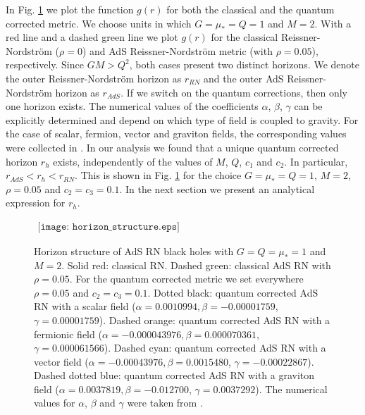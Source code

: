 \documentclass[10pt,a4paper]{article}
\begin{document}
In Fig. \ref{fig1} we plot the function $g(r)$ for both the classical and the quantum corrected metric. We choose units in which $G=\mu_{*}=Q=1$ and $M=2$. 
With a red line and a dashed green line we plot $g(r)$ for the classical Reissner-Nordstr\"om ($\rho=0$) and AdS Reissner-Nordstr\"om metric (with $\rho=0.05$), respectively. Since $GM>Q^2$, both cases present two distinct horizons. We denote the outer Reissner-Nordstr\"om horizon as $r_{RN}$ and the outer AdS Reissner-Nordstr\"om horizon as $r_{AdS}$. If we switch on the quantum corrections, then only one horizon exists. The numerical values of the coefficients $\alpha$, $\beta$, $\gamma$ can be explicitly determined and depend on which type of field is coupled to gravity. For the case of scalar, fermion, vector and graviton fields, the corresponding values were collected in  \cite{Donoghue:2014yha}. In our analysis we found that a unique quantum corrected horizon $r_h$ exists, independently of the values of $M$, $Q$, $c_{1}$ and $c_{2}$. In particular, $r_{AdS}<r_{h}<r_{RN}$. This is shown in Fig. \ref{fig1} for the choice  $G=\mu_{*}=Q=1$, $M=2$, $\rho=0.05$ and $c_2=c_3=0.1$. In the next section we present an analytical expression for $r_h$. 
\begin{figure}
\begin{center}$
\begin{array}{cccc}
\texttt{[image: horizon\_structure.eps]}
\end{array}$
\end{center}
\caption{Horizon structure of AdS RN black holes with $G=Q=\mu_{*}=1$ and $M=2$. Solid red: classical RN. Dashed green: classical AdS RN with $\rho=0.05$. For the quantum corrected metric we set everywhere $\rho=0.05$ and $c_{2}=c_{3}=0.1$. Dotted black: quantum corrected AdS RN with a scalar field ($\alpha=0.0010994, \beta=-0.00001759$, $\gamma=0.00001759$). Dashed orange: quantum corrected AdS RN with a fermionic field ($\alpha=-0.000043976, \beta=0.000070361$, $\gamma=0.000061566$). Dashed cyan: quantum corrected AdS RN with a vector field ($\alpha=-0.00043976, \beta=0.0015480$, $\gamma=-0.00022867$). Dashed dotted blue: quantum corrected AdS RN with a graviton field ($\alpha=0.0037819, \beta=-0.012700$, $\gamma=0.0037292$). The numerical values for $\alpha$, $\beta$ and $\gamma$ were taken from \cite{Donoghue:2014yha}.}
\label{fig1}
\end{figure}
\end{document}
